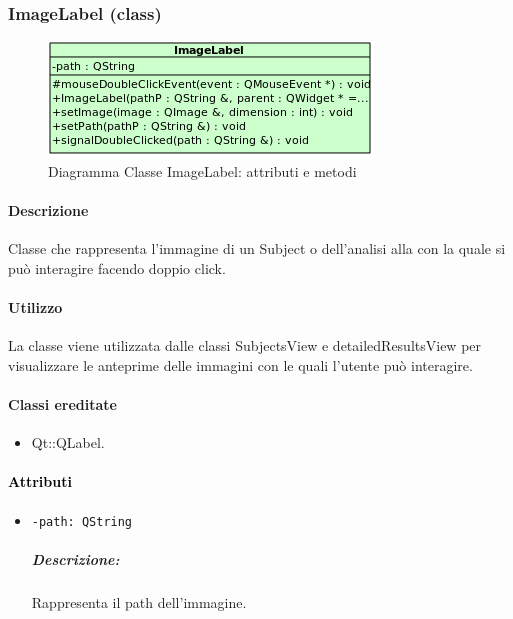 \subsubsection{ImageLabel (class)}
\label{speImage}
\begin{figure}[!h]
\centering
			\includegraphics[width=0.6\linewidth]{./Content/Immagini/view/ImageLabel.png}
			\caption{Diagramma Classe ImageLabel: attributi e metodi}
			\label{cl_image}
\end{figure}
\paragraph{Descrizione \\}
Classe che rappresenta l'immagine di un Subject\g{} o dell'analisi alla con la quale si può interagire facendo doppio click.
\paragraph{Utilizzo\\}
La classe viene utilizzata dalle classi SubjectsView e  detailedResultsView per visualizzare le anteprime delle immagini con le quali l'utente può interagire.
\paragraph{Classi ereditate\\}
\begin{itemize}
\item Qt::QLabel.
\end{itemize}
\paragraph{\textcolor{black}{Attributi\\}}
\begin{itemize}
\item \color{teal}\verb!-path: QString!
\color{black}
\subparagraph{Descrizione:} Rappresenta il path dell'immagine.
\end{itemize}

